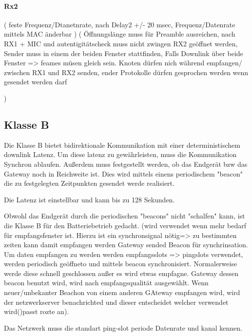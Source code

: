 \documentclass[a4paper,12pt]{article}
\begin{document}
                \paragraph{Rx2}
                    \cite{LoRaSpec}(
                        feste Frequenz/Dtanetnrate, nach Delay2 +/- 20 msec, Frequenz/Datenrate mittels MAC änderbar
                    )
                    \cite{LoRaSpec}(
                        Öffnungslänge muss für Preamble ausreichen, nach RX1 + MIC und autentigitätscheck muss nicht zwingen RX2 geöffnet werden, Sender muss in einem der beiden Fenster stattfinden, Falls Downlink über beide Fenster => feames müsen gleich sein. Knoten dürfen nich während empfangen/ zwischen RX1 und RX2 senden, ender Protokolle dürfen gesprochen werden wenn gesendet werden darf

                        )
        \subsection{Klasse B}
            Die Klasse B bietet bidirektionale Kommunikation mit einer deterministischem downlink Latenz. Um diese latenz zu gewährleisten, muss die Kommunikation Synchron ablaufen. Außerdem muss festgestellt werden, ob das Endgerät bzw das Gateway noch in Reichweite ist. Dies wird mittels einens periodischem "beacon" die zu festgelegten
            Zeitpunkten gesendet werde realisiert.

            Die Latenz ist einstellbar und kann bis zu 128 Sekunden.

            Obwohl das Endgerät durch die periodischen "beacons" nicht "schalfen" kann, ist die Klasse B für den Batteriebetrieb gedacht.
            \cite{LoRaSpec}(wird verwendet wenn mehr bedarf für empfangsfenster ist. Hierzu ist ein synchronsignal nötig=> zu bestimmten zeiten kann damit empfangen werden
                Gateway sended Beacon für synchrinsation. Um daten empfangen zu werden werden empfangsslots => pingslots verwendet, werden periodisch geöffneto und mittels beacon synchronisiert. Normalerweise werde diese schnell geschlossen außer es wird etwas empfagne.
                Gateway dessen beacon benutzt wird, wird nach empfangsqualität ausgewählt. Wenn neuer/unbekanter Beachon von einem anderen GAteway empfangen wird, wird der netzwerkserver benachrichted und dieser entscheidet welcher verwendet wird()passt rozte an).

                Das Netzwerk muss die standart ping-slot periode Datenrate und kanal kennen.
\end{document}

